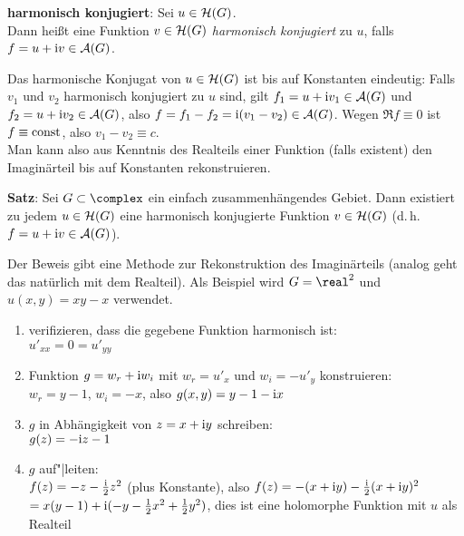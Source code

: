 \linie

\textbf{harmonisch konjugiert}:
Sei $u \in \mathcal{H}(G)$.\\
Dann heißt eine Funktion $v \in \mathcal{H}(G)$ \emph{harmonisch konjugiert} zu $u$,
falls $f = u + \mathrm{i} v \in \mathcal{A}(G)$.

Das harmonische Konjugat von $u \in \mathcal{H}(G)$ ist bis auf Konstanten eindeutig:
Falls $v_1$ und $v_2$ harmonisch konjugiert zu $u$ sind, gilt
$f_1 = u + \mathrm{i} v_1 \in \mathcal{A}(G)$ und $f_2 = u + \mathrm{i} v_2 \in \mathcal{A}(G)$, also
$f = f_1 - f_2 = \mathrm{i} (v_1 - v_2) \in \mathcal{A}(G)$.
Wegen $\Re f \equiv 0$ ist $f \equiv \operatorname{const}$, also $v_1 - v_2 \equiv c$.\\
Man kann also aus Kenntnis des Realteils einer Funktion (falls existent) den
Imaginärteil bis auf Konstanten rekonstruieren.

\textbf{Satz}:
Sei $G \subset \complex$ ein einfach zusammenhängendes Gebiet.
Dann existiert zu jedem $u \in \mathcal{H}(G)$ eine harmonisch konjugierte Funktion
$v \in \mathcal{H}(G)$ (d.\,h. $f = u + \mathrm{i} v \in \mathcal{A}(G)$).

Der Beweis gibt eine Methode zur Rekonstruktion des Imaginärteils
(analog geht das natürlich mit dem Realteil).
Als Beispiel wird $G = \real^2$ und $u(x, y) = xy - x$ verwendet.

\begin{enumerate}
    \item
    verifizieren, dass die gegebene Funktion harmonisch ist:\\
    $u'_{xx} = 0 = u'_{yy}$
    
    \item
    Funktion $g = w_r + \mathrm{i} w_i$ mit $w_r = u'_x$ und $w_i = -u'_y$
    konstruieren:\\
    $w_r = y - 1$, $w_i = -x$, also
    $g(x, y) = y - 1 - \mathrm{i} x$
    
    \item
    $g$ in Abhängigkeit von $z = x + \mathrm{i} y$ schreiben:\\
    $g(z) = -\mathrm{i} z - 1$
    
    \item
    $g$ auf"|leiten:\\
    $f(z) = -z - \frac{\mathrm{i}}{2} z^2$ (plus Konstante), also
    $f(z) = -(x + \mathrm{i} y) - \frac{\mathrm{i}}{2} (x + \mathrm{i} y)^2$\\
    $= x(y - 1) + \mathrm{i} (-y - \frac{1}{2} x^2 + \frac{1}{2} y^2)$,
    dies ist eine holomorphe Funktion mit $u$ als Realteil
\end{enumerate}

\linie

